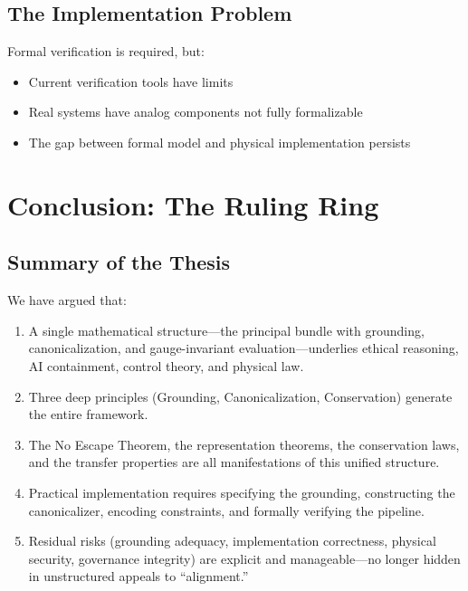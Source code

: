 \documentclass[12pt]{article}
\begin{document}
\subsection{The Implementation Problem}

Formal verification is required, but:

\begin{itemize}
    \item Current verification tools have limits
    \item Real systems have analog components not fully formalizable
    \item The gap between formal model and physical implementation persists
\end{itemize}

\section{Conclusion: The Ruling Ring}

\subsection{Summary of the Thesis}

We have argued that:

\begin{enumerate}
    \item A single mathematical structure---the principal bundle with grounding, canonicalization, and gauge-invariant evaluation---underlies ethical reasoning, AI containment, control theory, and physical law.

    \item Three deep principles (Grounding, Canonicalization, Conservation) generate the entire framework.

    \item The No Escape Theorem, the representation theorems, the conservation laws, and the transfer properties are all manifestations of this unified structure.

    \item Practical implementation requires specifying the grounding, constructing the canonicalizer, encoding constraints, and formally verifying the pipeline.

    \item Residual risks (grounding adequacy, implementation correctness, physical security, governance integrity) are explicit and manageable---no longer hidden in unstructured appeals to ``alignment.''
\end{enumerate}
\end{document}
